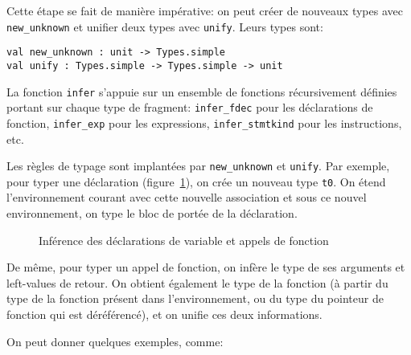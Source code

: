 Cette étape se fait de manière impérative: on peut créer de nouveaux types avec
\texttt{new\_unknown} et unifier deux types
avec \texttt{unify}. Leurs types sont:

\begin{verbatim}
val new_unknown : unit -> Types.simple
val unify : Types.simple -> Types.simple -> unit
\end{verbatim}

La fonction \texttt{infer} s'appuie sur un ensemble de fonctions récursivement
définies portant sur chaque type de fragment: \texttt{infer\_fdec} pour les
déclarations de fonction, \texttt{infer\_exp} pour les expressions,
\texttt{infer\_stmtkind} pour les instructions, etc.

Les règles de typage sont implantées par \texttt{new\_unknown} et
\texttt{unify}. Par exemple, pour typer une déclaration
(figure~\ref{fig:implem-unif-stmt}), on crée un nouveau
type \texttt{t0}. On étend l'environnement courant avec cette nouvelle
association et sous ce nouvel environnement, on type le bloc de portée de la
déclaration.

\begin{figure}[h] %


\caption{Inférence des déclarations de variable et appels de
         fonction}

\label{fig:implem-unif-stmt}
\end{figure}%

De même, pour typer un appel de fonction, on infère le type de ses arguments et
left-values de retour. On obtient également le type de la fonction (à partir du
type de la fonction présent dans l'environnement, ou du type du pointeur de
fonction qui est déréférencé), et on unifie ces deux informations.

On peut donner quelques exemples, comme:

